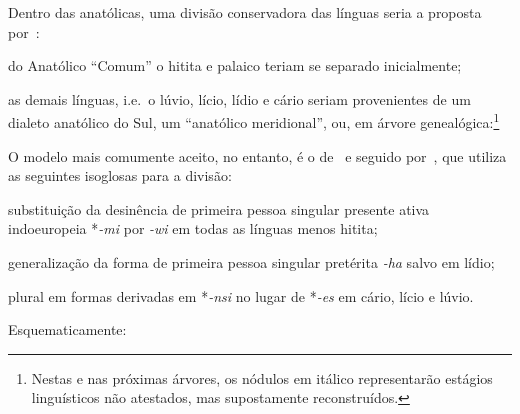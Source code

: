 Dentro das anatólicas, uma divisão conservadora das línguas seria a proposta
por~\citet[305--6]{Rieken2017}:
\begin{inparaenum}
	\item do Anatólico ``Comum'' o hitita e palaico teriam se separado
	inicialmente;
	\item as demais línguas, i.e.\ o lúvio, lício, lídio e cário seriam
	provenientes de um dialeto anatólico do Sul, um
	``anatólico meridional'', ou, em árvore genealógica:\footnote{Nestas e nas
		próximas árvores, os nódulos em itálico representarão estágios linguísticos
		não atestados, mas supostamente reconstruídos.}
\end{inparaenum}

\vspace{3pt}
\begin{center}
\end{center}

O modelo mais comumente aceito, no entanto, é o de~\citet[92]{Oettinger1978} e
seguido por~\citet[6]{Yakubovich2010}, que utiliza as seguintes isoglosas para a
divisão:
\begin{inparaenum}
	\item substituição da desinência de primeira pessoa singular presente ativa
	indoeuropeia *\emph{-mi} por \emph{-wi} em todas as línguas menos hitita;
	\item generalização da forma de primeira pessoa singular pretérita \emph{-ha}
	salvo em lídio;
	\item plural em formas derivadas em *\emph{-nsi} no lugar de *\emph{-es} em
	cário, lício e lúvio.
\end{inparaenum}
Esquematicamente:

\begin{center}
\end{center}

